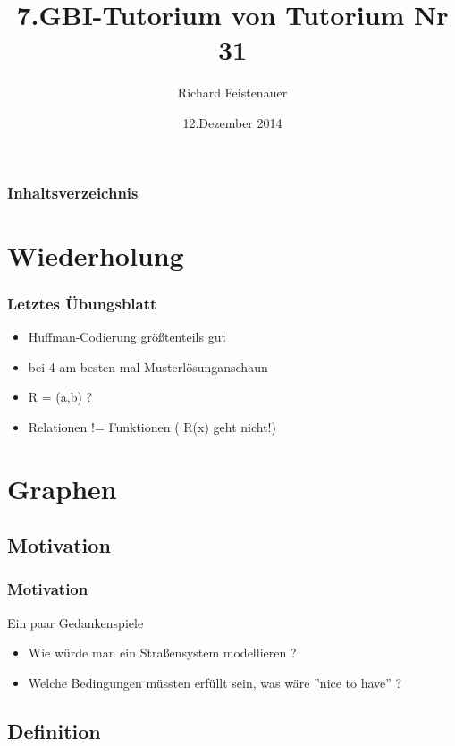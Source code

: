\documentclass{beamer}
\author{Richard Feistenauer}
\title{7.GBI-Tutorium von Tutorium Nr 31}
\date{12.Dezember 2014}
\begin{document}
\begin {frame}
	\titlepage
\end {frame}

\begin {frame}
	\frametitle {Inhaltsverzeichnis}
	\tableofcontents
\end {frame}

\section{Wiederholung}

\begin{frame}
	\frametitle{Letztes \"Ubungsblatt}
		\begin{itemize}
			\item Huffman-Codierung größtenteils gut
			\item bei 4 am besten mal Musterlösunganschaun
			\item R = (a,b) ?
			\item Relationen != Funktionen ( R(x) geht nicht!)
		\end{itemize}
\end{frame}

\section{Graphen} 
\subsection{Motivation}

\begin{frame}
	\frametitle{Motivation}

	\begin{block}{Ein paar Gedankenspiele}

		\begin{itemize}
			\item Wie w\"urde man ein Stra{\ss}ensystem modellieren ?
			\item Welche Bedingungen m\"ussten erf\"ullt sein, was w\"are ''nice to have'' ?
		\end{itemize}


	\end{block}
\end{frame}

\subsection{Definition}
\end{document}
